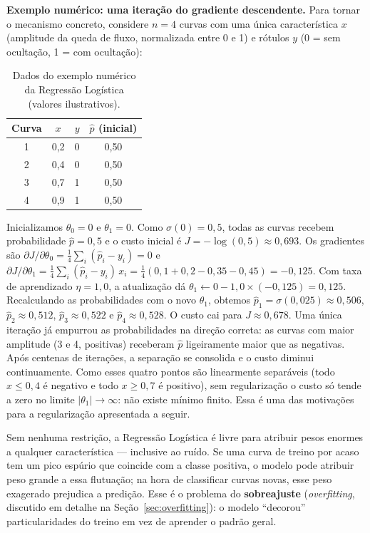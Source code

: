 \vspace{0.3cm}
\noindent\textbf{Exemplo numérico: uma iteração do gradiente descendente.}
Para tornar o mecanismo concreto, considere $n = 4$ curvas com uma única característica $x$ (amplitude da queda de fluxo, normalizada entre 0 e 1) e rótulos $y$ (0 = sem ocultação, 1 = com ocultação):

\begin{table}[htbp]
\centering
\small
\begin{tabular}{cccc}
\hline
Curva & $x$ & $y$ & $\hat{p}$ (inicial) \\
\hline
1 & 0{,}2 & 0 & 0{,}50 \\
2 & 0{,}4 & 0 & 0{,}50 \\
3 & 0{,}7 & 1 & 0{,}50 \\
4 & 0{,}9 & 1 & 0{,}50 \\
\hline
\end{tabular}
\caption{Dados do exemplo numérico da Regressão Logística (valores ilustrativos).}
\label{tab:exemplo_logistica}
\end{table}

Inicializamos $\theta_0 = 0$ e $\theta_1 = 0$. Como $\sigma(0) = 0{,}5$, todas as curvas recebem probabilidade $\hat{p} = 0{,}5$ e o custo inicial é $J = -\log(0{,}5) \approx 0{,}693$. Os gradientes são $\partial J / \partial \theta_0 = \frac{1}{4}\sum_i (\hat{p}_i - y_i) = 0$ e $\partial J / \partial \theta_1 = \frac{1}{4}\sum_i (\hat{p}_i - y_i)\,x_i = \frac{1}{4}(0{,}1 + 0{,}2 - 0{,}35 - 0{,}45) = -0{,}125$. Com taxa de aprendizado $\eta = 1{,}0$, a atualização dá $\theta_1 \leftarrow 0 - 1{,}0 \times (-0{,}125) = 0{,}125$. Recalculando as probabilidades com o novo $\theta_1$, obtemos $\hat{p}_1 = \sigma(0{,}025) \approx 0{,}506$, $\hat{p}_2 \approx 0{,}512$, $\hat{p}_3 \approx 0{,}522$ e $\hat{p}_4 \approx 0{,}528$. O custo cai para $J \approx 0{,}678$. Uma única iteração já empurrou as probabilidades na direção correta: as curvas com maior amplitude (3 e 4, positivas) receberam $\hat{p}$ ligeiramente maior que as negativas. Após centenas de iterações, a separação se consolida e o custo diminui continuamente. Como esses quatro pontos são linearmente separáveis (todo $x \le 0{,}4$ é negativo e todo $x \ge 0{,}7$ é positivo), sem regularização o custo só tende a zero no limite $|\theta_1| \to \infty$: não existe mínimo finito. Essa é uma das motivações para a regularização apresentada a seguir.
\vspace{0.3cm}

Sem nenhuma restrição, a Regressão Logística é livre para atribuir pesos enormes a qualquer característica --- inclusive ao ruído. Se uma curva de treino por acaso tem um pico espúrio que coincide com a classe positiva, o modelo pode atribuir peso grande a essa flutuação; na hora de classificar curvas novas, esse peso exagerado prejudica a predição. Esse é o problema do \textbf{sobreajuste} (\textit{overfitting}, discutido em detalhe na Seção~\ref{sec:overfitting}): o modelo ``decorou'' particularidades do treino em vez de aprender o padrão geral.

